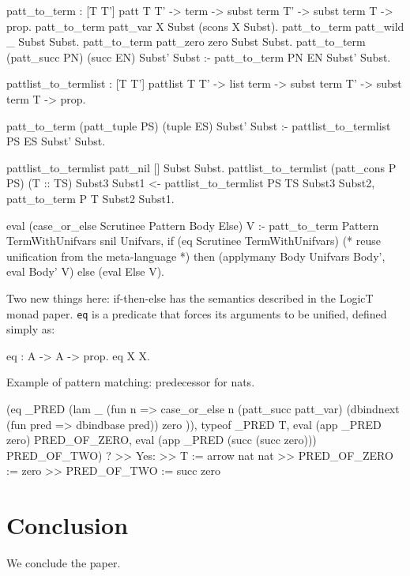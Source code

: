 \documentclass[format=acmlarge,review,anonymous]{acmart}\settopmatter{printfolios=true}
\begin{document}
\begin{codequote}
patt_to_term : [T T'] patt T T' -> term -> subst term T' -> subst term T -> prop.
patt_to_term patt_var X Subst (scons X Subst).
patt_to_term patt_wild _ Subst Subst.
patt_to_term patt_zero zero Subst Subst.
patt_to_term (patt_succ PN) (succ EN) Subst' Subst :- patt_to_term PN EN Subst' Subst.

pattlist_to_termlist : [T T'] pattlist T T' -> list term -> subst term T' -> subst term T -> prop.

patt_to_term (patt_tuple PS) (tuple ES) Subst' Subst :-
  pattlist_to_termlist PS ES Subst' Subst.

pattlist_to_termlist patt_nil [] Subst Subst.
pattlist_to_termlist (patt_cons P PS) (T :: TS) Subst3 Subst1 <-
  pattlist_to_termlist PS TS Subst3 Subst2,
  patt_to_term P T Subst2 Subst1.

eval (case_or_else Scrutinee Pattern Body Else) V :-
  patt_to_term Pattern TermWithUnifvars snil Unifvars,
  if (eq Scrutinee TermWithUnifvars)  (* reuse unification from the meta-language *)
  then (applymany Body Unifvars Body', eval Body' V)
  else (eval Else V).
\end{codequote}

Two new things here: if-then-else has the semantics described in the LogicT monad paper. \texttt{eq}
is a predicate that forces its arguments to be unified, defined simply as:

\begin{codequote}
eq : A -> A -> prop.
eq X X.
\end{codequote}

Example of pattern matching: predecessor for nats.

\begin{codequote}
(eq _PRED 
  (lam _ (fun n => 
    case_or_else n
      (patt_succ patt_var) (dbindnext (fun pred => dbindbase pred))
      zero
      )),
 typeof _PRED T,
 eval (app _PRED zero) PRED_OF_ZERO,
 eval (app _PRED (succ (succ zero))) PRED_OF_TWO) ?
>> Yes:
>> T := arrow nat nat
>> PRED_OF_ZERO := zero
>> PRED_OF_TWO := succ zero
\end{codequote}



\section{Conclusion}

\TODO{} We conclude the paper.


\end{document}
